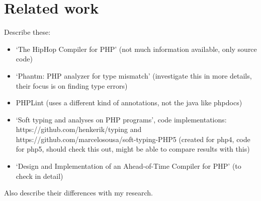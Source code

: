 \documentclass[../main.tex]{subfiles}
\begin{document}
    \section{Related work}
    Describe these:
    \begin{itemize}
        \item `The HipHop Compiler for PHP'\cite{Zhao:12} (not much information available, only source code)
        \item `Phantm: PHP analyzer for type mismatch'\cite{Kne:10,Bar:10} (investigate this in more details, their focus is on finding type errors)
        \item PHPLint \footnotemark (uses a different kind of annotations, not the java like phpdocs)
        \item `Soft typing and analyses on PHP programs'\cite{}, code implementations: https://github.com/henkerik/typing and https://github.com/marcelosousa/soft-typing-PHP5 (created for php4, code for php5, should check this out, might be able to compare results with this)
        \item `Design and Implementation of an Ahead-of-Time Compiler for PHP'\cite{Big:10} (to check in detail)
    \end{itemize}
    Also describe their differences with my research.
    
\end{document}
